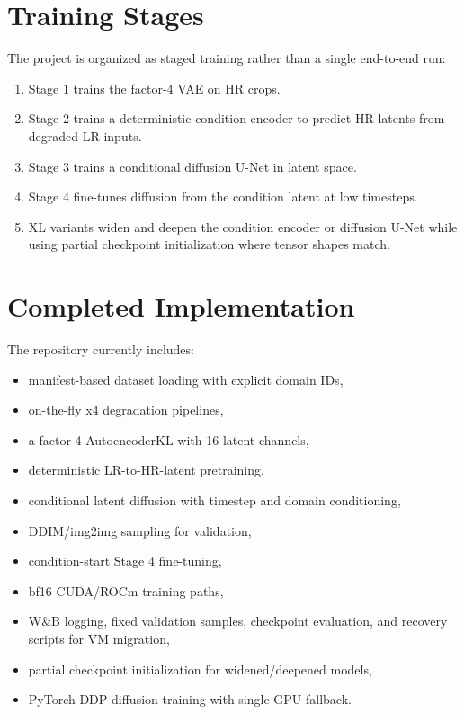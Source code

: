 \documentclass[10pt]{article}
\begin{document}
\section{Training Stages}

The project is organized as staged training rather than a single end-to-end run:

\begin{enumerate}
  \item Stage 1 trains the factor-4 VAE on HR crops.
  \item Stage 2 trains a deterministic condition encoder to predict HR latents
        from degraded LR inputs.
  \item Stage 3 trains a conditional diffusion U-Net in latent space.
  \item Stage 4 fine-tunes diffusion from the condition latent at low timesteps.
  \item XL variants widen and deepen the condition encoder or diffusion U-Net
        while using partial checkpoint initialization where tensor shapes match.
\end{enumerate}

\section{Completed Implementation}

The repository currently includes:
\begin{itemize}
  \item manifest-based dataset loading with explicit domain IDs,
  \item on-the-fly x4 degradation pipelines,
  \item a factor-4 AutoencoderKL with 16 latent channels,
  \item deterministic LR-to-HR-latent pretraining,
  \item conditional latent diffusion with timestep and domain conditioning,
  \item DDIM/img2img sampling for validation,
  \item condition-start Stage 4 fine-tuning,
  \item bf16 CUDA/ROCm training paths,
  \item W\&B logging, fixed validation samples, checkpoint evaluation, and
        recovery scripts for VM migration,
  \item partial checkpoint initialization for widened/deepened models,
  \item PyTorch DDP diffusion training with single-GPU fallback.
\end{itemize}
\end{document}
